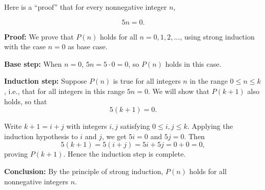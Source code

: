 \begin{example}\label{example:induction:fall3} 
Here is a ``proof'' that for every nonnegative integer $n$, 

\[ \tag{$P(n)$} 5n=0.  \]

\textbf{Proof:} We prove that $P(n)$ holds for all $n=0,1,2,\dots$, using
strong induction with the case $n=0$ as base case.

\textbf{Base step:} When $n=0$, $5n=5\cdot0=0$, so $P(n)$ holds in this case.

\textbf{Induction step:} 
Suppose $P(n)$ is true for all integers $n$ in the range $0\le n\le k$, i.e.,
that for all integers in this range $5n=0$.  We will show that $P(k+1)$ also holds, so that
\[ \tag{$P(k+1)$} 5(k+1)=0.  \]

Write $k+1=i+j$ with integers $i,j$ satisfying $0\le i,j\le k$. 
Applying the induction hypothesis to $i$ and $j$, we get $5i=0$ and $5j=0$.
Then
\[
5(k+1)=5(i+j)=5i+5j=0+0=0,
\]
proving $P(k+1)$.  Hence the induction step is complete.

\textbf{Conclusion:} By the principle of strong induction, $P(n)$ holds for all
nonnegative integers $n$.
\end{example}



